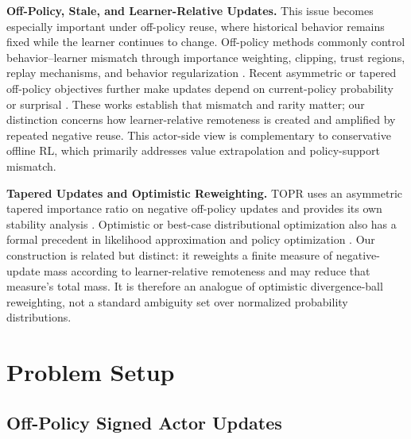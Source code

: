\documentclass{article}
\theoremstyle{plain}
\theoremstyle{definition}
\theoremstyle{remark}
\begin{document}
\textbf{Off-Policy, Stale, and Learner-Relative Updates.}
This issue becomes especially important under off-policy reuse, where
historical behavior remains fixed while the learner continues to change.
Off-policy methods commonly control behavior--learner mismatch through
importance weighting, clipping, trust regions, replay mechanisms, and
behavior regularization
\citep{schulman2017proximal,haarnoja2018soft,levine2020offline,
fujimoto2019off,kumar2020conservative}. Recent asymmetric or tapered
off-policy objectives further make updates depend on current-policy
probability or surprisal
\citep{arnal2025asymmetric,leroux2025tapered}. These works establish
that mismatch and rarity matter; our distinction concerns how
learner-relative remoteness is created and amplified by repeated
negative reuse. This actor-side view is complementary to conservative
offline RL, which primarily addresses value extrapolation and
policy-support mismatch.

\textbf{Tapered Updates and Optimistic Reweighting.}
TOPR uses an asymmetric tapered importance ratio on negative off-policy
updates and provides its own stability analysis
\citep{leroux2025tapered}. Optimistic or best-case distributional
optimization also has a formal precedent in likelihood approximation
and policy optimization
\citep{nguyen2019optimistic,song2020optimistic}. Our construction is
related but distinct: it reweights a finite measure of negative-update
mass according to learner-relative remoteness and may reduce that
measure's total mass. It is therefore an analogue of optimistic
divergence-ball reweighting, not a standard ambiguity set over normalized
probability distributions.

\section{Problem Setup}
\label{sec:problem_setup}


\subsection{Off-Policy Signed Actor Updates}
\end{document}
